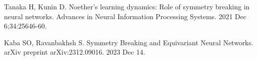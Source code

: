 \begin{latin}
	\begin{thebibliography}{9}
		Tanaka H, Kunin D. Noether’s learning dynamics: Role of symmetry breaking in neural networks. Advances in Neural Information Processing Systems. 2021 Dec 6;34:25646-60.
		
		Kaba SO, Ravanbakhsh S. Symmetry Breaking and Equivariant Neural Networks. arXiv preprint arXiv:2312.09016. 2023 Dec 14.
	\end{thebibliography} 
\end{latin}